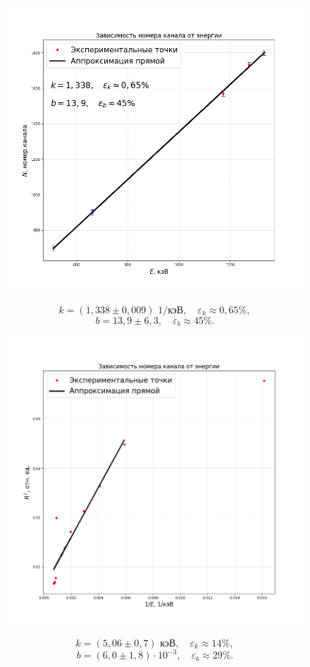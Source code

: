 \documentclass[a4paper,12pt]{article}
\begin{document}
\newpage
\begin{figure}[H]\label{fig: N(E)}
    \centering
    \includegraphics[width = \textwidth]{N(E).png}
\end{figure}
\[k = (1,338 \pm 0,009)\text{ 1/кэВ}, \quad \varepsilon_k \approx 0,65 \%,\]
\[b = 13,9 \pm 6,3, \quad \varepsilon_b \approx 45 \%.\]
\newpage

\begin{figure}[H]\label{fig: RR(E-1)}
    \centering
    \includegraphics[width = \textwidth]{RR(E-1).png}
\end{figure}
\[k = (5,06 \pm 0,7)\text{ кэВ}, \quad \varepsilon_k \approx 14 \%,\]
\[b = (6,0 \pm 1,8)\cdot 10^{-3}, \quad \varepsilon_b \approx 29 \%.\]
\newpage
\end{document}
